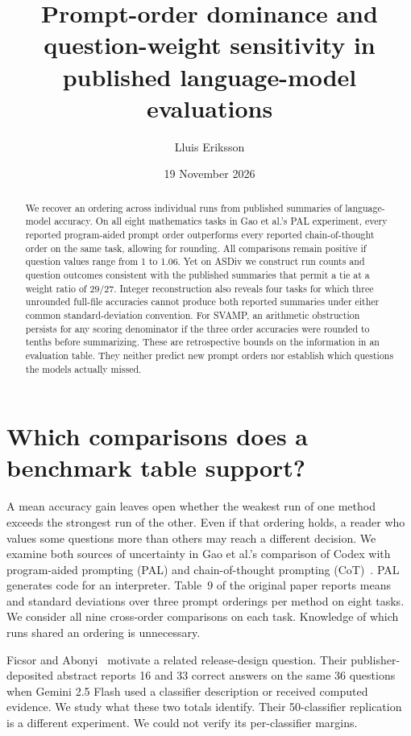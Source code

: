 \documentclass[10pt]{article}
\title{Prompt-order dominance and question-weight sensitivity in published language-model evaluations}
\author{Lluis Eriksson}
\date{19 November 2026}
\begin{document}
\maketitle
\begin{abstract}
We recover an ordering across individual runs from published summaries of language-model accuracy. On all eight mathematics tasks in Gao et al.'s PAL experiment, every reported program-aided prompt order outperforms every reported chain-of-thought order on the same task, allowing for rounding. All comparisons remain positive if question values range from 1 to 1.06. Yet on ASDiv we construct run counts and question outcomes consistent with the published summaries that permit a tie at a weight ratio of $29/27$. Integer reconstruction also reveals four tasks for which three unrounded full-file accuracies cannot produce both reported summaries under either common standard-deviation convention. For SVAMP, an arithmetic obstruction persists for any scoring denominator if the three order accuracies were rounded to tenths before summarizing. These are retrospective bounds on the information in an evaluation table. They neither predict new prompt orders nor establish which questions the models actually missed.
\end{abstract}

\section{Which comparisons does a benchmark table support?}
A mean accuracy gain leaves open whether the weakest run of one method exceeds the strongest run of the other. Even if that ordering holds, a reader who values some questions more than others may reach a different decision. We examine both sources of uncertainty in Gao et al.'s comparison of Codex with program-aided prompting (PAL) and chain-of-thought prompting (CoT)~\cite{gao}. PAL generates code for an interpreter. Table~9 of the original paper reports means and standard deviations over three prompt orderings per method on eight tasks. We consider all nine cross-order comparisons on each task. Knowledge of which runs shared an ordering is unnecessary.

Ficsor and Abonyi~\cite{ficsor} motivate a related release-design question. Their publisher-deposited abstract reports 16 and 33 correct answers on the same 36 questions when Gemini 2.5 Flash used a classifier description or received computed evidence. We study what these two totals identify. Their 50-classifier replication is a different experiment. We could not verify its per-classifier margins.
\end{document}
